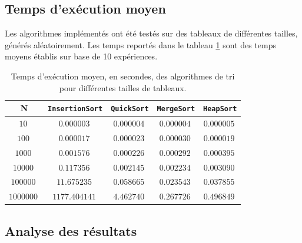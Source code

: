 \documentclass[a4paper, 12pt]{article}
\begin{document}
	\subsection{Temps d'exécution moyen}
	Les algorithmes implémentés ont été testés sur des tableaux de différentes tailles, générés aléatoirement. Les temps reportés dans le tableau \ref{table:tab_time_1} sont des temps moyens établis sur base de 10 expériences.
	\begin{table}[!h]
	    \centering
	    \begin{tabular}{|c|c|c|c|c|}
	        \hline
	        \textbf{N} & \texttt{InsertionSort} & \texttt{QuickSort} & \texttt{MergeSort} & \texttt{HeapSort}\\
	        \hline
	        \hline
	        \(\SI{10}{}\) & \(\SI{0.000003}{}\) & \(\SI{0.000004}{}\) & \(\SI{0.000004}{}\) & \(\SI{0.000005}{}\)\\
	        \(\SI{100}{}\) & \(\SI{0.000017}{}\) & \(\SI{0.000023}{}\) & \(\SI{0.000030}{}\) & \(\SI{0.000019}{}\)\\
	        \(\SI{1000}{}\) & \(\SI{0.001576}{}\) & \(\SI{0.000226}{}\) & \(\SI{0.000292}{}\) & \(\SI{0.000395}{}\)\\
	        \(\SI{10000}{}\) & \(\SI{0.117356}{}\) & \(\SI{0.002145}{}\) & \(\SI{0.002234}{}\) & \(\SI{0.003090}{}\)\\
	        \(\SI{100000}{}\) & \(\SI{11.675235}{}\) & \(\SI{0.058665}{}\) & \(\SI{0.023543}{}\) & \(\SI{0.037855}{}\)\\
	        \(\SI{1000000}{}\) & \(\SI{1177.404141}{}\) & \(\SI{4.462740}{}\) & \(\SI{0.267726}{}\) & \(\SI{0.496849}{}\)\\
	        \hline
	    \end{tabular}
	    \caption{Temps d'exécution moyen, en secondes, des algorithmes de tri pour différentes tailles de tableaux.}
	    \label{table:tab_time_1}
	\end{table}
	\subsection{Analyse des résultats}
\end{document}
